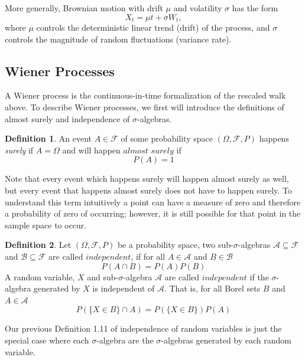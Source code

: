 \documentclass[12pt]{article}
\theoremstyle{definition}
\newtheorem{definition}{Definition}[section]
\theoremstyle{plain}
\theoremstyle{remark}
\begin{document}
More generally, Brownian motion with drift $\mu$ and volatility $\sigma$ has the form
\[
X_t = \mu t + \sigma W_t,
\]
where $\mu$ controls the deterministic linear trend (drift) of the process, and $\sigma$ controls the magnitude of random fluctuations (variance rate).

\subsection{Wiener Processes}

A Wiener process is the continuous-in-time formalization of the  rescaled walk above.  To describe Wiener processes, we first will introduce the definitions of almost surely and independence of $\sigma$-algebras.

\begin{definition}
    An event $A \in \mathcal{F}$ of some probability space $(\Omega, \mathcal{F}, P)$ happens \textit{surely} if $A = \Omega$ and will happen $\textit{almost surely}$ if
    \[
    P(A)=1
    \]
\end{definition}

Note that every event which happens surely will happen almost surely as well, but every event that happens almost surely does not have to happen surely.  To understand this term intuitively a point can have a measure of zero and therefore a probability of zero of occurring; however, it is still possible for that point in the sample space to occur.

\begin{definition}
Let $(\Omega, \mathcal{F}, P)$ be a probability space, two sub-$\sigma$-algebras $\mathcal{A} \subseteq \mathcal{F}$ and $\mathcal{B}\subseteq \mathcal{F}$ are called $\textit{independent}$, if for all $A \in \mathcal{A}$ and $B \in \mathcal{B}$
\[
P(A \cap B) = P(A)P(B)
\]
A random variable, $X$ and sub-$\sigma$-algebra $\mathcal{A}$ are called $\textit{independent}$ if the $\sigma$-algebra generated by $X$ is independent of $\mathcal{A}$.  That is, for all Borel sets $B$ and $A \in \mathcal{A}$
\[
P(\{X \in B\} \cap A) = P(\{X \in B \})P(A)
\]
\end{definition}

Our previous Definition 1.11 of independence of random variables is just the special case where each $\sigma$-algebra are the $\sigma$-algebras generated by each random variable.
\end{document}
